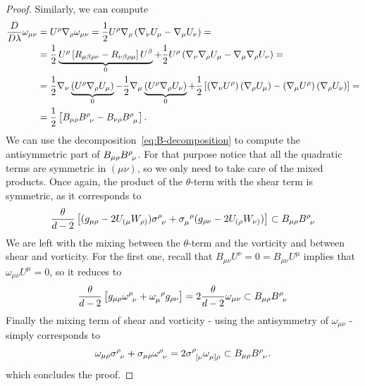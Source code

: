 \begin{proof}
		Similarly, we can compute
		\small{
		\begin{align*}
			\frac{D}{D\lambda}\omega_{\mu\nu} &= U^{\rho}\nabla_{\rho}\omega_{\mu\nu} = \frac{1}{2}U^{\rho}\nabla_{\rho}\left( \nabla_{\nu}U_{\mu} - \nabla_{\mu}U_{\nu} \right) = \\
		&= \frac{1}{2}\underbrace{U^{\rho} \left[R_{\mu\beta\rho\nu} - R_{\nu\beta\rho\mu}\right]U^{\beta}}_{0} + \frac{1}{2}U^{\rho}\left(\nabla_{\nu}\nabla_{\rho}U_{\mu} - \nabla_{\mu}\nabla_{\rho}U_{\nu}\right) = \\
		&= \frac{1}{2} \nabla_{\nu}\underbrace{\left( U^{\rho} \nabla_{\rho}U_{\mu}\right)}_{0} -  \frac{1}{2} \nabla_{\mu}\underbrace{\left( U^{\rho} \nabla_{\rho}U_{\nu}\right)}_{0} + \frac{1}{2}\left[\left(\nabla_{\nu}U^{\rho}\right)\left(\nabla_{\rho}U_{\mu}\right) - \left(\nabla_{\mu}U^{\rho}\right)\left(\nabla_{\rho}U_{\nu}\right) \right] =\\
		&= \frac{1}{2} \left[B_{\mu\rho}B\indices{^{\rho}_{\nu}} - B_{\nu\rho}B\indices{^{\rho}_{\mu}} \right].
		\end{align*}
		}
		We can use the decomposition~\ref{eq:B-decomposition} to compute the antisymmetric part of \(B_{\mu\rho}B\indices{^{\rho}_{\nu}}\). For that purpose notice that all the quadratic terms are symmetric in \((\mu\nu)\), so we only need to take care of the mixed products. Once again, the product of the \(\theta\)-term with the shear term is symmetric, as it corresponds to
		\[
		\frac{\theta}{d - 2}\left[(g_{\mu\rho} - 2U_{(\mu}W_{\rho)}) \sigma\indices{^{\rho}_{\nu}} + \sigma\indices{_{\mu}^{\rho}}(g_{\rho\nu} - 2U_{(\rho}W_{\nu)})\right] \subset B_{\mu\rho}B\indices{^{\rho}_{\nu}}
		\]
		We are left with the mixing between the \(\theta\)-term and the vorticity and between shear and vorticity. For the first one, recall that \(B_{\mu\nu}U^{\nu} = 0 = B_{\mu\nu}U^{\mu}\) implies that \(\omega_{\mu\nu}U^{\mu} = 0\), so it reduces to
		\[
		\frac{\theta}{d - 2}\left[g_{\mu\rho}\omega\indices{^{\rho}_{\nu}} + \omega\indices{_{\mu}^{\rho}}g_{\rho\nu}\right] = 2 \frac{\theta}{d -2}\omega_{\mu\nu} \subset B_{\mu\rho}B\indices{^{\rho}_{\nu}}
		\]
		Finally the mixing term of shear and vorticity - using the antisymmetry of \(\omega_{\mu\nu}\) - simply corresponds to 
		\[
		\omega_{\mu\rho} \sigma\indices{^{\rho}_{\nu}} + \sigma_{\mu\rho} \omega\indices{^{\rho}_{\nu}} = 2 \sigma\indices{^{\rho}_{[\nu}}\omega\indices{_{\mu]\rho}} \subset B_{\mu\rho}B\indices{^{\rho}_{\nu}}.
		\]
		which concludes the proof.
	\end{proof}
	
